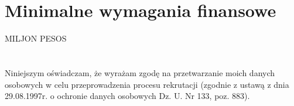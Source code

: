 \documentclass[11pt,a4paper]{article}
\begin{document}
\section{Minimalne wymagania finansowe}
MILJON PESOS

\section{}
\scriptsize{
Niniejszym oświadczam, że wyrażam zgodę na przetwarzanie moich danych osobowych w celu przeprowadzenia procesu
rekrutacji (zgodnie z ustawą z dnia 29.08.1997r. o ochronie danych osobowych Dz. U. Nr 133, poz. 883).
}
\end{document}
